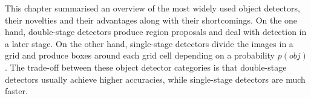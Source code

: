 This chapter summarised an overview of the most widely used object detectors, their novelties and their advantages along with their shortcomings. On the one hand, double-stage detectors produce region proposals and deal with detection in a later stage. On the other hand, single-stage detectors divide the images in a grid and produce boxes around each grid cell depending on a probability $p(obj)$. The trade-off between these object detector categories is that double-stage detectors usually achieve higher accuracies, while single-stage detectors are much faster.
